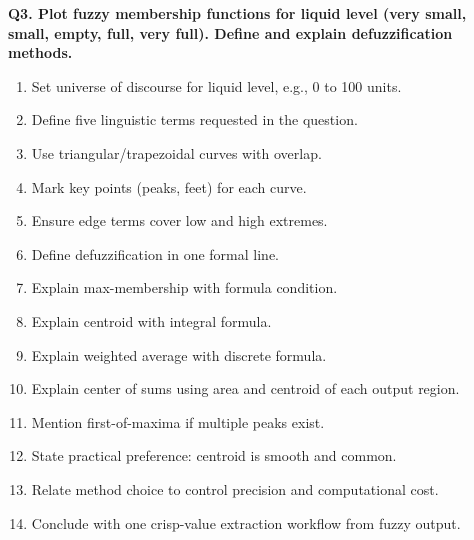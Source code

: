 \documentclass[11pt,a4paper]{article}
\begin{document}
\textbf{Q3. Plot fuzzy membership functions for liquid level (very small, small, empty, full, very full). Define and explain defuzzification methods.}
\begin{enumerate}
\item Set universe of discourse for liquid level, e.g., 0 to 100 units.
\item Define five linguistic terms requested in the question.
\item Use triangular/trapezoidal curves with overlap.
\item Mark key points (peaks, feet) for each curve.
\item Ensure edge terms cover low and high extremes.
\item Define defuzzification in one formal line.
\item Explain max-membership with formula condition.
\item Explain centroid with integral formula.
\item Explain weighted average with discrete formula.
\item Explain center of sums using area and centroid of each output region.
\item Mention first-of-maxima if multiple peaks exist.
\item State practical preference: centroid is smooth and common.
\item Relate method choice to control precision and computational cost.
\item Conclude with one crisp-value extraction workflow from fuzzy output.
\end{enumerate}
\end{document}
